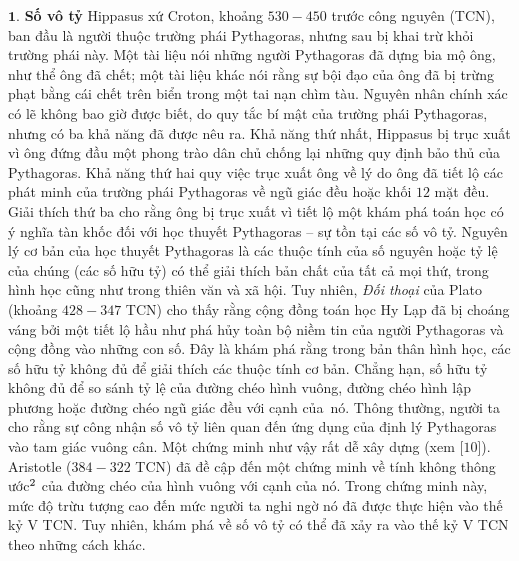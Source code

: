 \begin{multicols}{2}
	$\pmb{1.}$ \textbf{\color{lichsutoanhoc}Số vô tỷ}
	\vskip 0.05cm
	Hippasus xứ Croton, khoảng $530-450$ trước công nguyên (TCN), ban đầu là người thuộc trường phái Pythagoras, nhưng sau bị khai trừ khỏi trường phái này. Một tài liệu nói những người Pythagoras đã dựng bia mộ ông, như thể ông đã chết; một tài liệu khác nói rằng sự bội đạo của ông đã bị trừng phạt bằng cái chết trên biển trong một tai nạn chìm tàu. Nguyên nhân chính xác có lẽ không bao giờ được biết, do quy tắc bí mật của trường phái Pythagoras, nhưng có ba khả năng đã được nêu ra. 
	\vskip 0.05cm
	Khả năng thứ nhất, Hippasus bị trục xuất vì ông đứng đầu một phong trào dân chủ chống lại những quy định bảo thủ của Pythagoras.
	\vskip 0.05cm
	Khả năng thứ hai quy việc trục xuất ông về lý do ông đã tiết lộ các phát minh của trường phái Pythagoras về ngũ giác đều hoặc khối $12$ mặt đều. 
	\vskip 0.05cm
	Giải thích thứ ba cho rằng ông bị trục xuất vì tiết lộ một khám phá toán học có ý nghĩa tàn khốc đối với học thuyết Pythagoras -- sự tồn tại các số vô tỷ.
	\vskip 0.1cm
	Nguyên lý cơ bản của học thuyết Pythagoras là các thuộc tính của số nguyên hoặc tỷ lệ của chúng (các số hữu tỷ) có thể giải thích bản chất của tất cả mọi thứ, trong hình học cũng như trong thiên văn và xã hội. Tuy nhiên, \textit{Đối thoại} của Plato (khoảng $428-347$ TCN) cho thấy rằng cộng đồng toán học Hy Lạp đã bị choáng váng bởi một tiết lộ hầu như phá hủy toàn bộ niềm tin của người Pythagoras và cộng đồng vào những con số. Đây là khám phá rằng trong bản  thân hình học, các số hữu tỷ không đủ để giải thích các thuộc tính cơ bản. Chẳng hạn, số hữu tỷ không đủ để so sánh tỷ lệ của đường chéo hình vuông, đường chéo hình lập phương hoặc đường chéo ngũ giác đều với cạnh của~nó. 
	\vskip 0.1cm
	Thông thường, người ta cho rằng sự công nhận số vô tỷ liên quan đến ứng dụng của định lý Pythagoras vào tam giác vuông cân. Một chứng minh như vậy rất dễ xây dựng (xem [$10$]). Aristotle ($384-322$ TCN) đã đề cập đến một chứng minh về tính không thông ước$^{\small2}$ của đường chéo của hình vuông với cạnh của nó. Trong chứng minh này, mức độ trừu tượng cao đến mức người ta nghi ngờ nó đã được thực hiện vào thế kỷ V TCN. Tuy nhiên,  khám phá về số vô tỷ có thể đã xảy ra vào thế kỷ V TCN theo những cách khác. 
	\vskip 0.1cm

\end{multicols}
